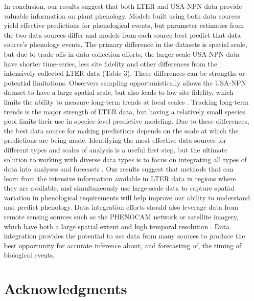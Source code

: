 \documentclass[fleqn,12pt,lineno]{article}
\begin{document}
In conclusion, our results suggest that both LTER and USA-NPN data provide valuable information on plant phenology. Models built using both data sources yield effective predictions for phenological events, but parameter estimates from the two data sources differ and models from each source best predict that data source's phenology events. The primary difference in the datasets is spatial scale, but due to trade-offs in data collection efforts, the larger scale USA-NPN data have shorter time-series, less site fidelity and other differences from the intensively collected LTER data (Table 3). These differences can be strengths or potential limitations. Observers sampling opportunistically allows the USA-NPN dataset to have a large spatial scale, but also leads to low site fidelity, which limits the ability to measure long-term trends at local scales \citep{gerst2016}. Tracking long-term trends is the major strength of LTER data, but having a relatively small species pool limits their use in species-level predictive modeling. Due to these differences, the best data source for making predictions depends on the scale at which the predictions are being made. Identifying the most effective data sources for different types and scales of analysis is a useful first step, but the ultimate solution to working with diverse data types is to focus on integrating all types of data into analyses and forecasts \citep{hanks2018, melaas2016}. Our results suggest that methods that can learn from the intensive information available in LTER data in regions where they are available, and simultaneously use large-scale data to capture spatial variation in phenological requirements will help improve our ability to understand and predict phenology. Data integration efforts should also leverage data from remote sensing sources such as the PHENOCAM network or satellite imagery, which have both a large spatial extent and high temporal resolution \citep{peng2017,richardson2018a,richardson2018b}. Data integration provides the potential to use data from many sources to produce the best opportunity for accurate inference about, and forecasting of, the timing of biological events.


\section*{Acknowledgments}
\end{document}

